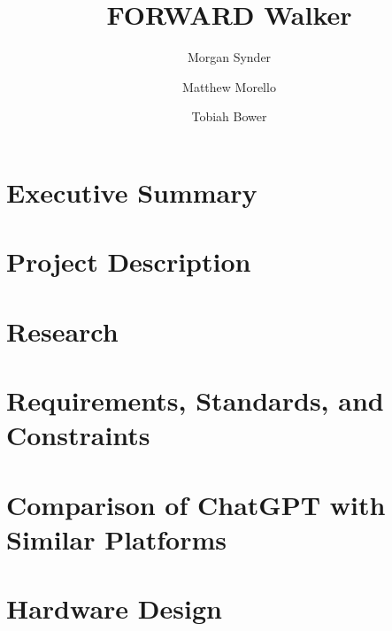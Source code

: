 \documentclass[12pt, letterpaper]{article}
\title{FORWARD Walker}
\author{Morgan Synder \and Matthew Morello \and Tobiah Bower}
\begin{document}
	

	\tableofcontents
	\listoffigures
	\setcounter{secnumdepth}{2}

	\newpage
	\section{Executive Summary}
	
	
	\section{Project Description}
	
	
	
	
	
	
	\section{Research}
	
	
	
	
	
	
	\section{Requirements, Standards, and Constraints}
	
	
	
	
	
	
	

	\section{Comparison of ChatGPT with Similar Platforms}
	
	\section{Hardware Design}
	
\end{document}
